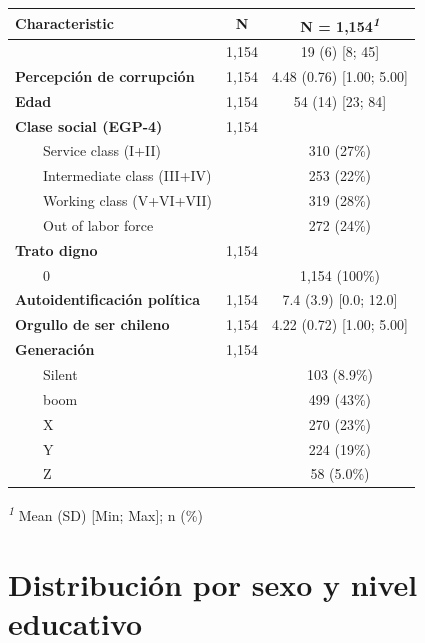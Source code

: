 \documentclass[
  spanish,
  a4paper,
  oneside]{scrbook}
\begin{document}
\begin{table}
\fontsize{12.0pt}{14.0pt}\selectfont
\begin{tabular*}{\linewidth}{@{\extracolsep{\fill}}lcc}
\toprule
\textbf{Characteristic} & \textbf{N} & \textbf{N = 1,154}\textsuperscript{\textit{1}} \\ 
\midrule\addlinespace[2.5pt]
{\bfseries Cohesión social vertical} & 1,154 & 19 (6) [8; 45] \\ 
{\bfseries Percepción de corrupción} & 1,154 & 4.48 (0.76) [1.00; 5.00] \\ 
{\bfseries Edad} & 1,154 & 54 (14) [23; 84] \\ 
{\bfseries Clase social (EGP-4)} & 1,154 &  \\ 
    Service class (I+II) &  & 310 (27\%) \\ 
    Intermediate class (III+IV) &  & 253 (22\%) \\ 
    Working class (V+VI+VII) &  & 319 (28\%) \\ 
    Out of labor force &  & 272 (24\%) \\ 
{\bfseries Trato digno} & 1,154 &  \\ 
    0 &  & 1,154 (100\%) \\ 
{\bfseries Autoidentificación política} & 1,154 & 7.4 (3.9) [0.0; 12.0] \\ 
{\bfseries Orgullo de ser chileno} & 1,154 & 4.22 (0.72) [1.00; 5.00] \\ 
{\bfseries Generación} & 1,154 &  \\ 
    Silent &  & 103 (8.9\%) \\ 
    boom &  & 499 (43\%) \\ 
    X &  & 270 (23\%) \\ 
    Y &  & 224 (19\%) \\ 
    Z &  & 58 (5.0\%) \\ 
\bottomrule
\end{tabular*}
\begin{minipage}{\linewidth}
\vspace{.05em}
\textsuperscript{\textit{1}} Mean (SD) {[}Min; Max{]}; n (\%)\\
\end{minipage}
\end{table}

\chapter{Distribución por sexo y nivel
educativo}\label{distribuciuxf3n-por-sexo-y-nivel-educativo}
\end{document}
